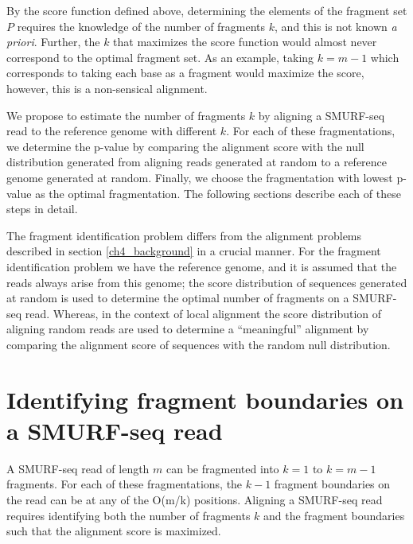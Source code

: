By the score function defined above, determining the elements of the
fragment set $P$ requires the knowledge of the number of fragments $k$,
and this is not known \emph{a priori}. Further, the $k$ that maximizes
the score function would almost never correspond to the optimal fragment
set. As an example, taking $k=m-1$ which corresponds to taking each base
as a fragment would maximize the score, however, this is a non-sensical
alignment.

We propose to estimate the number of fragments $k$ by aligning a
SMURF-seq read to the reference genome with different $k$. For each of
these fragmentations, we determine the p-value by comparing the
alignment score with the null distribution generated from aligning reads
generated at random to a reference genome generated at random. Finally,
we choose the fragmentation with lowest p-value as the optimal
fragmentation.  The following sections describe each of these steps in
detail.

The fragment identification problem differs from the alignment problems
described in section \ref{ch4_background} in a crucial manner. For the
fragment identification problem we have the reference genome, and it is
assumed that the reads always arise from this genome; the score
distribution of sequences generated at random is used to determine the
optimal number of fragments on a SMURF-seq read. Whereas, in the context
of local alignment the score distribution of aligning random reads are
used to determine a ``meaningful'' alignment by comparing the alignment
score of sequences with the random null distribution.



\section{Identifying fragment boundaries on a SMURF-seq read}
\label{frag_bound_id}
A SMURF-seq read of length $m$ can be fragmented into $k=1$ to $k=m-1$
fragments. For each of these fragmentations, the $k-1$ fragment
boundaries on the read can be at any of the O(m/k) positions. Aligning
a SMURF-seq read requires identifying both the number of fragments $k$
and the fragment boundaries such that the alignment score is maximized.

